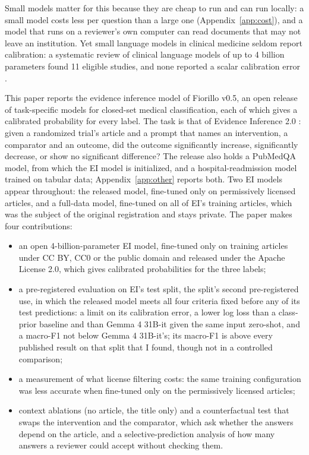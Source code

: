 \documentclass[11pt,letterpaper]{article}
\begin{document}
Small models matter for this because they are cheap to run and can run locally: a small model costs less per question than a large one (Appendix~\ref{app:cost}), and a model that runs on a reviewer's own computer can read documents that may not leave an institution. Yet small language models in clinical medicine seldom report calibration: a systematic review of clinical language models of up to 4 billion parameters found 11 eligible studies, and none reported a scalar calibration error \citep{gorenshtein2026}.

This paper reports the evidence inference model of Fiorillo v0.5, an open release of task-specific models for closed-set medical classification, each of which gives a calibrated probability for every label. The task is that of Evidence Inference 2.0 \citep[EI;][]{lehman2019,deyoung2020}: given a randomized trial's article and a prompt that names an intervention, a comparator and an outcome, did the outcome significantly increase, significantly decrease, or show no significant difference? The release also holds a PubMedQA model, from which the EI model is initialized, and a hospital-readmission model trained on tabular data; Appendix~\ref{app:other} reports both. Two EI models appear throughout: the released model, fine-tuned only on permissively licensed articles, and a full-data model, fine-tuned on all of EI's training articles, which was the subject of the original registration and stays private. The paper makes four contributions:
\begin{itemize}\setlength{\itemsep}{1pt}
\item an open 4-billion-parameter EI model, fine-tuned only on training articles under CC BY, CC0 or the public domain and released under the Apache License 2.0, which gives calibrated probabilities for the three labels;
\item a pre-registered evaluation on EI's test split, the split's second pre-registered use, in which the released model meets all four criteria fixed before any of its test predictions: a limit on its calibration error, a lower log loss than a class-prior baseline and than Gemma 4 31B-it given the same input zero-shot, and a macro-F1 not below Gemma 4 31B-it's; its macro-F1 is above every published result on that split that I found, though not in a controlled comparison;
\item a measurement of what license filtering costs: the same training configuration was less accurate when fine-tuned only on the permissively licensed articles;
\item context ablations (no article, the title only) and a counterfactual test that swaps the intervention and the comparator, which ask whether the answers depend on the article, and a selective-prediction analysis of how many answers a reviewer could accept without checking them.
\end{itemize}
\end{document}
